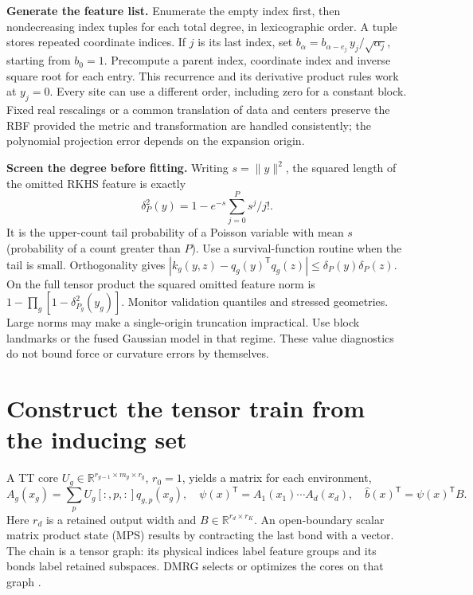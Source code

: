 \documentclass[11pt,a4paper]{article}
\newcommand{\R}{\mathbb R}\newcommand{\dd}{\mathrm d}
\newcommand{\T}{\mathsf T}\newcommand{\tr}{\operatorname{tr}}
\begin{document}
\textbf{Generate the feature list.} Enumerate the empty index first, then nondecreasing index tuples for each total degree, in lexicographic order. A tuple stores repeated coordinate indices. If $j$ is its last index, set $b_\alpha=b_{\alpha-e_j}\,y_j/\sqrt{\alpha_j}$, starting from $b_0=1$. Precompute a parent index, coordinate index and inverse square root for each entry. This recurrence and its derivative product rules work at $y_j=0$. Every site can use a different order, including zero for a constant block. Fixed real rescalings or a common translation of data and centers preserve the RBF provided the metric and transformation are handled consistently; the polynomial projection error depends on the expansion origin.

\textbf{Screen the degree before fitting.} Writing $s=\|y\|^2$, the squared length of the omitted RKHS feature is exactly
\[
 \delta_P^2(y)=1-e^{-s}\sum_{j=0}^P s^j/j! .
\]
It is the upper-count tail probability of a Poisson variable with mean $s$ (probability of a count greater than $P$). Use a survival-function routine when the tail is small. Orthogonality gives $|k_g(y,z)-q_g(y)^\T q_g(z)|\le\delta_P(y)\delta_P(z)$. On the full tensor product the squared omitted feature norm is $1-\prod_g[1-\delta_{P_g}^2(y_g)]$. Monitor validation quantiles and stressed geometries. Large norms may make a single-origin truncation impractical. Use block landmarks or the fused Gaussian model in that regime. These value diagnostics do not bound force or curvature errors by themselves.
\pg\section{Construct the tensor train from the inducing set}\label{sec:sweep}
A TT core $U_g\in\R^{r_{g-1}\times m_g\times r_g}$, $r_0=1$, yields a matrix for each environment,
\begin{equation}
 A_g(x_g)=\sum_p U_g[:,p,:]q_{g,p}(x_g),\quad
 \psi(x)^\T=A_1(x_1)\cdots A_d(x_d),\quad
 \widehat b(x)^\T=\psi(x)^\T B . \label{eq:tt}
\end{equation}
Here $r_d$ is a retained output width and $B\in\R^{r_d\times r_K}$. An open-boundary scalar matrix product state (MPS) results by contracting the last bond with a vector. The chain is a tensor graph: its physical indices label feature groups and its bonds label retained subspaces. DMRG selects or optimizes the cores on that graph \cite{white,oseledets,als,etn}.

\begin{center}
\end{center}
\end{document}
